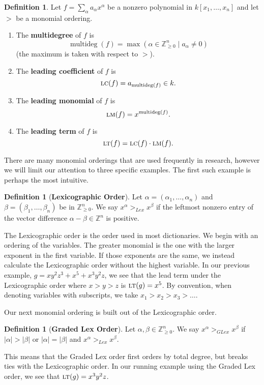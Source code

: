 \documentclass[MS, xcolor=dvipsnames]{wfuthesis}
\def\bZ{\mathbb{Z}}
\newcommand{\LT}{\ensuremath{\text{\sc lt}}}
\newcommand{\LM}{\ensuremath{\text{\sc lm}}}
\newcommand{\LC}{\ensuremath{\text{\sc lc}}}
\DeclareMathOperator{\multideg}{multideg}
\theoremstyle{definition}
\newtheorem{definition}[theorem]{Definition}
\begin{document}
\begin{definition}
  Let $f = \sum_\alpha a_\alpha x^\alpha$ be a nonzero polynomial in $k[x_1,\dots,x_n]$ and let $>$ be a monomial ordering.
  \begin{enumerate}[label=(\roman*)]
    \item The \textbf{multidegree} of $f$ is
    \[ \multideg(f) = \max(\alpha \in \bZ_{\ge0}^n \mid a_\alpha \ne 0) \]
    (the maximum is taken with respect to $>$).
    \item The \textbf{leading coefficient} of $f$ is
    \[ \LC(f) = a_{\multideg(f)} \in k. \]
    \item The \textbf{leading monomial} of $f$ is
    \[ \LM(f) = x^{\multideg(f)}. \]
    \item The \textbf{leading term} of $f$ is
    \[ \LT(f) = \LC(f) \cdot \LM(f). \]
  \end{enumerate}
\end{definition}
There are many monomial orderings that are used frequently in research, however we will limit our attention to three specific examples. The first such example is perhaps the most intuitive.
\begin{definition}[\bf Lexicographic Order]
  Let $\alpha = (\alpha_1, \dots, \alpha_n)$ and $\beta = (\beta_1,\dots,\beta_n)$ be in $\bZ_{\ge0}^n$. We say $x^\alpha >_{Lex} x^\beta$ if the leftmost nonzero entry of the vector difference $\alpha - \beta \in \bZ^n$ is positive.
\end{definition}
The Lexicographic order is the order used in most dictionaries. We begin with an ordering of the variables. The greater monomial is the one with the larger exponent in the first variable. If those exponents are the same, we instead calculate the Lexicographic order without the highest variable. In our previous example, $g = xy^2z^3 + x^5 + x^3y^2z$, we see that the lead term under the Lexicographic order where $x>y>z$ is $\LT(g)=x^5$. By convention, when denoting variables with subscripts, we take $x_1 > x_2 > x_3 > \dots$. \par
Our next monomial ordering is built out of the Lexicographic order.
\begin{definition}[\bf Graded Lex Order]
  Let $\alpha,\beta \in \bZ_{\ge0}^n$. We say $x^\alpha >_{GLex} x^\beta$ if $|\alpha| > |\beta|$ or $|\alpha|=|\beta|$ and $x^\alpha >_{Lex} x^\beta$.
\end{definition}
This means that the Graded Lex order first orders by total degree, but breaks ties with the Lexicographic order. In our running example using the Graded Lex order, we see that $\LT(g)=x^3y^2z$. \par
\end{document}
